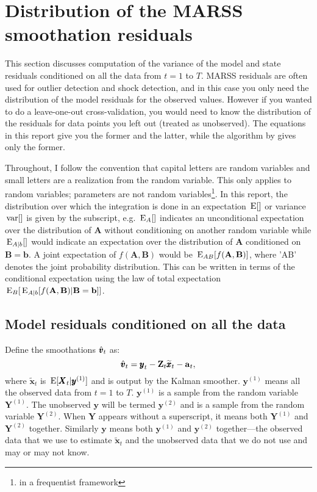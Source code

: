 \documentclass[]{article}
\def\UPS{\mbox{\boldmath $\Upsilon$}}
\def\XI{\mbox{\boldmath $\Xi$}}
\def\AA{\mbox{$\mathbf A$}}	\def\aa{\mbox{$\mathbf a$}}
\def\BB{\mbox{$\mathbf B$}}	\def\bb{\mbox{$\mathbf b$}} \def\Bb{\mbox{$\mathbf J$}} \def\Ba{\mbox{$\mathbf L$}} \def\Bm{\UPS}
\def\E{\,\textup{\textrm{E}}}
\def\XX{\mbox{$\pmb{X}$}}	\def\xx{\mbox{$\pmb{x}$}}
\def\YY{\mbox{$\pmb{Y}$}}	\def\yy{\mbox{$\pmb{y}$}}
\def\ZZ{\mbox{$\mathbf Z$}}	\def\zz{\mbox{$\mathbf z$}}	\def\Zb{\mbox{$\mathbf M$}} \def\Za{\mbox{$\mathbf N$}} \def\Zm{\XI}
\def\var{\,\textup{\textrm{var}}}
\def\hatxt{\widetilde{\xx}_t}
\begin{document}
\section{Distribution of the MARSS smoothation residuals}\label{sec:smoothations}

This section discusses computation of the variance of the model and state residuals conditioned on all the data from $t=1$ to $T$.  MARSS residuals are often used for outlier detection and shock detection, and in this case you only need the distribution of the model residuals for the observed values.  However if you wanted to do a leave-one-out cross-validation, you would need to know the distribution of the residuals for data points you left out (treated as unobserved).  The equations in this report give you the former and the latter, while the algorithm by \citet{Harveyetal1998} gives only the former.

Throughout, I follow the convention that capital letters are random variables and small letters are a realization from the random variable.  This only applies to random variables; parameters are not random variables\footnote{in a frequentist framework}. In this report, the distribution over which the integration is done in an expectation $\E[ ]$ or variance $\var[ ]$ is given by the subscript, e.g. $\E_A[ ]$ indicates an unconditional expectation over the distribution of $\AA$ without conditioning on another random variable while $\E_{A|b}[ ]$ would indicate an expectation over the distribution of $\AA$ conditioned on $\BB=\bb$. A joint expectation of $f(\AA,\BB)$ would be $\E_{AB}[f(\AA,\BB)]$, where 'AB' denotes the joint probability distribution. This can be written in terms of the conditional expectation using the law of total expectation $\E_B[\E_{A|b}[f(\AA,\BB)|\BB=\bb]]$.

\subsection{Model residuals conditioned on all the data}

Define the smoothations $\hat{\mbox{$\pmb{v}$}}_t$ as:
\begin{equation}\label{eq:vtT}
\hat{\vv}_t = \yy_t - \ZZ_t\hatxt - \aa_t,
\end{equation}
where  $\hatxt$ is $\E[\XX_t|\yy^{(1)}]$ and is output by the Kalman smoother. $\yy^{(1)}$ means all the observed data from $t=1$ to $T$. $\yy^{(1)}$ is a sample from the random variable $\YY^{(1)}$. The unobserved $\yy$ will be termed $\yy^{(2)}$ and is a sample from the random variable $\YY^{(2)}$. When $\YY$ appears without a superscript, it means both $\YY^{(1)}$ and $\YY^{(2)}$ together. Similarly $\yy$ means both $\yy^{(1)}$ and $\yy^{(2)}$ together---the observed data that we use to estimate $\hatxt$ and the unobserved data that we do not use and may or may not know.
\end{document}
